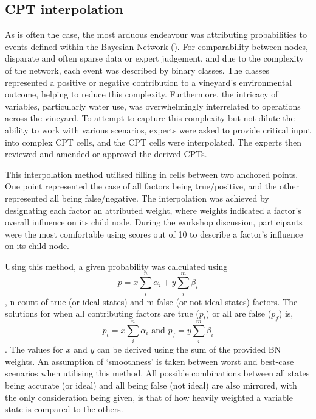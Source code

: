 \documentclass[10pt,letterpaper]{article}
\begin{document}
\subsection*{CPT interpolation}

As is often the case, the most arduous endeavour was attributing probabilities to events defined within the Bayesian Network (\cite{korbBayesianArtificialIntelligence2011}). For comparability between nodes, disparate and often sparse data or expert judgement, and due to the complexity of the network, each event was described by binary classes. The classes represented a positive or negative contribution to a vineyard's environmental outcome, helping to reduce this complexity. Furthermore, the intricacy of variables, particularly water use, was overwhelmingly interrelated to operations across the vineyard. To attempt to capture this complexity but not dilute the ability to work with various scenarios, experts were asked to provide critical input into complex CPT cells, and the CPT cells were interpolated. The experts then reviewed and amended or approved the derived CPTs.

This interpolation method utilised filling in cells between two anchored points. One point represented the case of all factors being true/positive, and the other represented all being false/negative. The interpolation was achieved by designating each factor an attributed weight, where weights indicated a factor's overall influence on its child node. During the workshop discussion, participants were the most comfortable using scores out of 10 to describe a factor's influence on its child node.

Using this method, a given probability was calculated using
\begin{equation}
        p=x\sum_{i}^{n}\alpha_{i} + y\sum_{i}^{m}\beta_{i} 
\end{equation},
n count of true (or ideal states) and m false (or not ideal states) factors. The solutions for when all contributing factors are true ($p_t$) or all are false ($p_f$) is,
\begin{equation}
        p_t=x\sum_{i}^{n}\alpha_{i} 
        \text{ and }
        p_f=y\sum_{i}^{m}\beta_{i}
\end{equation}.
The values for $x$ and $y$ can be derived using the sum of the provided BN weights. An assumption of `smoothness' is taken between worst and best-case scenarios when utilising this method. All possible combinations between all states being accurate (or ideal) and all being false (not ideal) are also mirrored, with the only consideration being given, is that of how heavily weighted a variable state is compared to the others.
\end{document}
